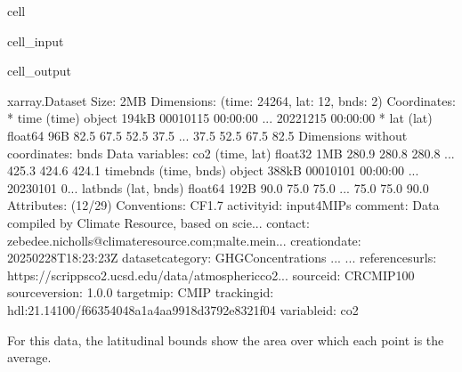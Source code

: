 \documentclass[letterpaper,10pt,english]{jupyterBook}
\begin{document}
\begin{sphinxuseclass}{cell}\begin{sphinxVerbatimInput}

\begin{sphinxuseclass}{cell_input}
\begin{sphinxVerbatim}[commandchars=\\\{\}]
\end{sphinxVerbatim}

\end{sphinxuseclass}\end{sphinxVerbatimInput}
\begin{sphinxVerbatimOutput}

\begin{sphinxuseclass}{cell_output}
\begin{sphinxVerbatim}[commandchars=\\\{\}]
\PYGZlt{}xarray.Dataset\PYGZgt{} Size: 2MB
Dimensions:    (time: 24264, lat: 12, bnds: 2)
Coordinates:
  * time       (time) object 194kB 0001\PYGZhy{}01\PYGZhy{}15 00:00:00 ... 2022\PYGZhy{}12\PYGZhy{}15 00:00:00
  * lat        (lat) float64 96B \PYGZhy{}82.5 \PYGZhy{}67.5 \PYGZhy{}52.5 \PYGZhy{}37.5 ... 37.5 52.5 67.5 82.5
Dimensions without coordinates: bnds
Data variables:
    co2        (time, lat) float32 1MB 280.9 280.8 280.8 ... 425.3 424.6 424.1
    time\PYGZus{}bnds  (time, bnds) object 388kB 0001\PYGZhy{}01\PYGZhy{}01 00:00:00 ... 2023\PYGZhy{}01\PYGZhy{}01 0...
    lat\PYGZus{}bnds   (lat, bnds) float64 192B \PYGZhy{}90.0 \PYGZhy{}75.0 \PYGZhy{}75.0 ... 75.0 75.0 90.0
Attributes: (12/29)
    Conventions:             CF\PYGZhy{}1.7
    activity\PYGZus{}id:             input4MIPs
    comment:                 Data compiled by Climate Resource, based on scie...
    contact:                 zebedee.nicholls@climate\PYGZhy{}resource.com;malte.mein...
    creation\PYGZus{}date:           2025\PYGZhy{}02\PYGZhy{}28T18:23:23Z
    dataset\PYGZus{}category:        GHGConcentrations
    ...                      ...
    references\PYGZus{}urls:         https://scrippsco2.ucsd.edu/data/atmospheric\PYGZus{}co2...
    source\PYGZus{}id:               CR\PYGZhy{}CMIP\PYGZhy{}1\PYGZhy{}0\PYGZhy{}0
    source\PYGZus{}version:          1.0.0
    target\PYGZus{}mip:              CMIP
    tracking\PYGZus{}id:             hdl:21.14100/f6635404\PYGZhy{}8a1a\PYGZhy{}4aa9\PYGZhy{}918d\PYGZhy{}3792e8321f04
    variable\PYGZus{}id:             co2
\end{sphinxVerbatim}

\end{sphinxuseclass}\end{sphinxVerbatimOutput}

\end{sphinxuseclass}
\sphinxAtStartPar
For this data, the latitudinal bounds show the area
over which each point is the average.
\end{document}
